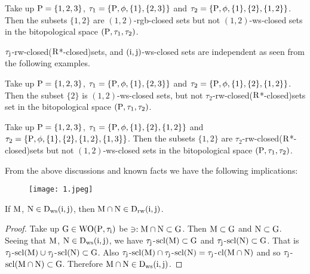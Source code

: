 \begin{exm}\label{exm8.2.9}
Take up $\mathrm{P}=\{1,2,3\}$, $\tau_1 =\{\mathrm{P}, \phi, \{1\}, \{ 2,3\}\}$ and $\tau_2 =\{\TSP, \phi, \{1\},\break \{2\},\{1,2\}\}$. Then the subsets $\{1, 2\}$ are $(1, 2)$-rgb-closed sets but not $(1, 2)$-ws-closed sets in the bitopological space $(\mathrm{P}, \tau_1, \tau_2 )$.
\end{exm}

\begin{rem}\label{rem8.2.2}
$\tau_{\mathrm{j}}$-rw-closed($\mathrm{R}$*-closed)sets, and $(\mathrm{i},\mathrm{j})$-ws-closed sets are independent as seen from the following examples.
\end{rem}

\begin{exm}\label{exm8.2.10}
Take up $\mathrm{P}= \{1,2,3\}$, $\tau_1 =\{\mathrm{P}, \phi, \{1\}, \{2,3\}\}$ and $\tau_2 =\{\TSP, \phi, \{1\},\break \{2\},\{1, 2\}\}$. Then the subset $\{2\}$ is $(1, 2)$-ws-closed sets, but not $\tau_2$-rw-closed($\mathrm{R}$*-closed)sets set in the bitopological space $(\mathrm{P}, \tau_1, \tau_2 )$.
\end{exm}

\begin{exm}\label{exm8.2.11}
Take up $\mathrm{P}=\{1,2,3\}$, $\tau_1 =\{\mathrm{P}, \phi, \{1\}, \{2\}, \{1, 2\}\}$ and $\tau_2 =\{\mathrm{P}, \phi, \{1\},\{2\},\{1,2\},\{1, 3\}\}$. Then the subsets $\{1,2\}$ are $\tau_2$-rw-closed($\mathrm{R}$*-closed)sets but not $(1, 2)$-ws-closed sets in the bitopological space $(\mathrm{P}, \tau_1, \tau_2 )$.
\end{exm}

\begin{rem}\label{rem8.2.3}
From the above discussions and known facts we have the following implications:
\begin{figure}[H]
\centering
\texttt{[image: 1.jpeg]}
\end{figure}
\end{rem}

\begin{thm}\label{thm8.2.10}
If $\mathrm{M}$, $\mathrm{N}\in \mathrm{D}_{\mathrm{ws}} (\mathrm{i}, \mathrm{j})$, then $\mathrm{M}\cap \mathrm{N}\in \mathrm{D}_{\mathrm{rw}} (\mathrm{i}, \mathrm{j})$.
\end{thm}

\begin{proof}
Take up $\mathrm{G}\in \mathrm{W}\mathrm{O}(\mathrm{P}, \tau_{\mathrm{i}})$ be $\ni: \mathrm{M}\cap \mathrm{N} \subset \mathrm{G}$. Then $\mathrm{M} \subset \mathrm{G}$ and $\mathrm{N} \subset \mathrm{G}$. Seeing that $\mathrm{M}$, $\mathrm{N}\in \mathrm{D}_{\mathrm{ws}} (\mathrm{i}, \mathrm{j})$, we have $\tau_{\mathrm{j}}$-$\mathrm{scl}(\mathrm{M}) \subset \mathrm{G}$ and $\tau_{\mathrm{j}}$-$\mathrm{scl}(\mathrm{N}) \subset \mathrm{G}$. That is $\tau_{\mathrm{j}}$-$\mathrm{scl}(\mathrm{M}) \cup \tau_{\mathrm{j}}$-$\mathrm{scl}(\mathrm{N}) \subset \mathrm{G}$. Also $\tau_{\mathrm{j}}$-$\mathrm{scl}(\mathrm{M}) \cap  \tau_{\mathrm{j}}$-$\mathrm{scl}(\mathrm{N})= \tau_{\mathrm{j}}$-$\mathrm{cl}(\mathrm{M}\cap \mathrm{N})$ and so $\tau_{\mathrm{j}}$-$\mathrm{scl}(\mathrm{M}\cap \mathrm{N}) \subset \mathrm{G}$. Therefore $\mathrm{M}\cap \mathrm{N}\in \mathrm{D}_{\mathrm{ws}} (\mathrm{i}, \mathrm{j})$.
\end{proof}

